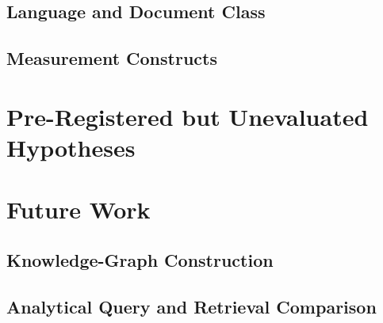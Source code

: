 \subsection{Language and Document Class}
\label{sec:lim-scope}

\subsection{Measurement Constructs}
\label{sec:lim-measurement}

\section{Pre-Registered but Unevaluated Hypotheses}
\label{sec:unevaluated}

\section{Future Work}
\label{sec:future-work}

\subsection{Knowledge-Graph Construction}
\label{sec:fw-kg}

\subsection{Analytical Query and Retrieval Comparison}
\label{sec:fw-query}

